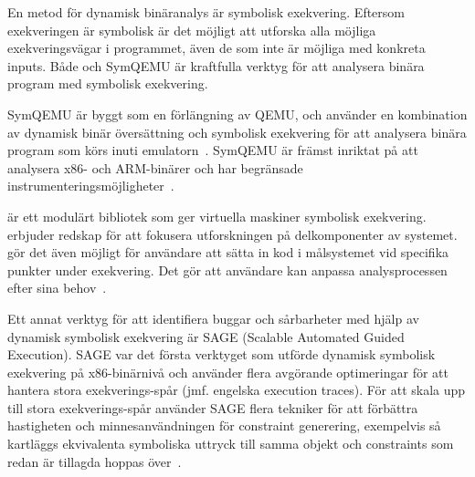 En metod för dynamisk binäranalys är symbolisk exekvering. Eftersom exekveringen är symbolisk är 
det möjligt att utforska alla möjliga exekveringsvägar i programmet, även de som inte är möjliga
med konkreta inputs. Både \stoe{} och SymQEMU är kraftfulla verktyg för att analysera binära program 
med symbolisk exekvering.

SymQEMU är byggt som en förlängning av QEMU, och använder en kombination av dynamisk binär 
översättning och symbolisk exekvering för att analysera binära program som körs inuti emulatorn~\cite{symqemu}.
SymQEMU är främst inriktat på att analysera x86- och ARM-binärer och har begränsade instrumenteringsmöjligheter~\cite{symbexec}.

\stoe{} är ett modulärt bibliotek som ger virtuella maskiner symbolisk exekvering. \stoe{} erbjuder 
redskap för att fokusera utforskningen på delkomponenter av systemet. \stoe{} gör det även 
möjligt för användare att sätta in kod i målsystemet vid specifika punkter under 
exekvering. Det gör att användare kan anpassa analysprocessen efter sina behov~\cite{s2e}. 

Ett annat verktyg för att identifiera buggar och sårbarheter med hjälp av dynamisk symbolisk 
exekvering är SAGE (Scalable Automated Guided Execution).
SAGE var det första verktyget som utförde dynamisk symbolisk exekvering på x86-binärnivå och använder flera 
avgörande optimeringar för att hantera stora exekverings-spår (jmf. engelska execution traces).
För att skala upp till stora exekverings-spår använder SAGE flera tekniker för att förbättra hastigheten och 
minnesanvändningen för constraint generering, exempelvis så kartläggs ekvivalenta symboliska uttryck till samma 
objekt och constraints som redan är tillagda hoppas över~\cite{sage}.